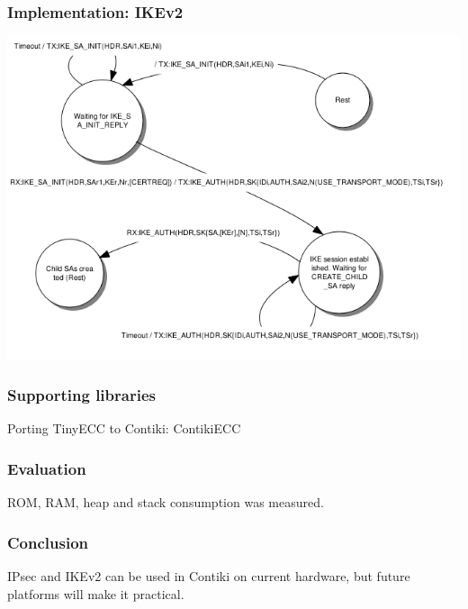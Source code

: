 \documentclass[pdf]{beamer}
\begin{document}
\begin{frame}
   \frametitle{Implementation: IKEv2}
   \includegraphics[scale=0.65]{bilder/initiator_mealy.png}
\end{frame}

\begin{frame}
   \frametitle{Supporting libraries}
   Porting TinyECC to Contiki: ContikiECC
\end{frame}

\begin{frame}
   \frametitle{Evaluation}
   ROM, RAM, heap and stack consumption was measured.
\end{frame}

\begin{frame}
   \frametitle{Conclusion}
   IPsec and IKEv2 can be used in Contiki on current hardware, but future platforms will make it practical. 
\end{frame}
\end{document}
